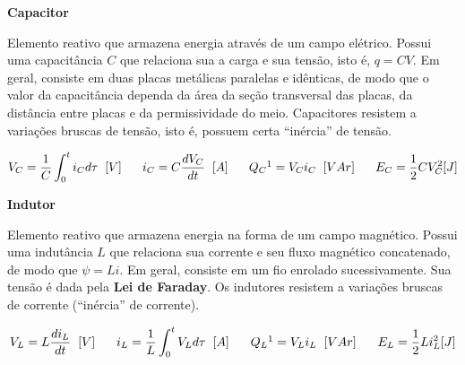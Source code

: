 \documentclass{article}
\numberwithin{equation}{section}
\begin{document}
\vspace{3mm}
\begin{center}\textbf{Capacitor}\end{center}

\justifying Elemento reativo que armazena energia através de um campo elétrico. Possui uma capacitância $C$ que relaciona sua a carga e sua tensão, isto é, $q=CV$. Em geral, consiste em duas placas metálicas paralelas e idênticas, de modo que o valor da capacitância dependa da área da seção transversal das placas, da distância entre placas e da permissividade do meio. Capacitores resistem a variações bruscas de tensão, isto é, possuem certa ``inércia'' de tensão.

\begin{equation}
    V_{C} = \frac{1}{C}\int_{0}^{t}{i_{C}} d\tau \hspace{0.2cm}[V]
    \hspace{0.6cm}
    i_{C} = C \frac{dV_{C}}{dt} \hspace{0.2cm} [A]
    \hspace{0.6cm}
    Q_{C}\footnotemark[1] = V_{C}i_{C} \hspace{0.2cm} [VAr]
    \hspace{0.6cm}
    E_{C} = \frac{1}{2}CV_{C}^{2} [J]
    \end{equation}

\newpage
\begin{center}\textbf{Indutor}\end{center}

\justifying Elemento reativo que armazena energia na forma de um campo magnético. Possui uma indutância $L$ que relaciona sua corrente e seu fluxo magnético concatenado, de modo que $\psi=Li$. Em geral, consiste em um fio enrolado sucessivamente. Sua tensão é dada pela \textbf{Lei de Faraday}. Os indutores resistem a variações bruscas de corrente (``inércia'' de corrente).

\begin{equation}
    V_{L} = L \frac{di_{L}}{dt} \hspace{0.2cm}[V]
    \hspace{0.6cm}
    i_{L} = \frac{1}{L}\int_{0}^{t}{V_{L}} d\tau \hspace{0.2cm} [A]
    \hspace{0.6cm}
    Q_{L}\footnotemark[1] = V_{L}i_{L} \hspace{0.2cm} [VAr]
    \hspace{0.6cm}
    E_{L} = \frac{1}{2}Li_{L}^{2} [J]
\end{equation}
\end{document}
